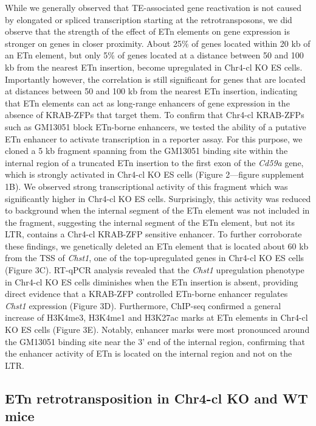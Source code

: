 \documentclass[11pt,a4paper]{article}
\begin{document}
While we generally observed that TE-associated gene reactivation is not caused by elongated or spliced transcription starting at the retrotransposons, we did observe that the strength of the effect of ETn elements on gene expression is stronger on genes in closer proximity. About 25\% of genes located within 20 kb of an ETn element, but only 5\% of genes located at a distance between 50 and 100 kb from the nearest ETn insertion, become upregulated in Chr4-cl KO ES cells. Importantly however, the correlation is still significant for genes that are located at distances between 50 and 100 kb from the nearest ETn insertion, indicating that ETn elements can act as long-range enhancers of gene expression in the absence of KRAB-ZFPs that target them. To confirm that Chr4-cl KRAB-ZFPs such as GM13051 block ETn-borne enhancers, we tested the ability of a putative ETn enhancer to activate transcription in a reporter assay. For this purpose, we cloned a 5 kb fragment spanning from the GM13051 binding site within the internal region of a truncated ETn insertion to the first exon of the \textit{Cd59a} gene, which is strongly activated in Chr4-cl KO ES cells (Figure 2—figure supplement 1B). We observed strong transcriptional activity of this fragment which was significantly higher in Chr4-cl KO ES cells. Surprisingly, this activity was reduced to background when the internal segment of the ETn element was not included in the fragment, suggesting the internal segment of the ETn element, but not its LTR, contains a Chr4-cl KRAB-ZFP sensitive enhancer. To further corroborate these findings, we genetically deleted an ETn element that is located about 60 kb from the TSS of \textit{Chst1}, one of the top-upregulated genes in Chr4-cl KO ES cells (Figure 3C). RT-qPCR analysis revealed that the \textit{Chst1} upregulation phenotype in Chr4-cl KO ES cells diminishes when the ETn insertion is absent, providing direct evidence that a KRAB-ZFP controlled ETn-borne enhancer regulates \textit{Chst1} expression (Figure 3D). Furthermore, ChIP-seq confirmed a general increase of H3K4me3, H3K4me1 and H3K27ac marks at ETn elements in Chr4-cl KO ES cells (Figure 3E). Notably, enhancer marks were most pronounced around the GM13051 binding site near the 3’ end of the internal region, confirming that the enhancer activity of ETn is located on the internal region and not on the LTR.

\subsection{ETn retrotransposition in Chr4-cl KO and WT mice}
\end{document}

